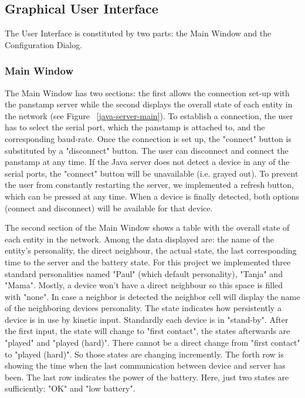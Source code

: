 \subsection{Graphical User Interface}

The User Interface is constituted by two parts: the Main Window and the Configuration Dialog.

\subsubsection{Main Window}

The Main Window has two sections: the first allows the connection set-up with the panstamp server while the second displays the overall state of each entity in the network (see Figure ~\ref{java-server-main}). 
To establish a connection, the user has to select the serial port, which the panstamp is attached to, and the corresponding baud-rate. Once the connection is set up, the "connect" button is substituted by a "disconnect" button. The user can disconnect and connect the panstamp at any time. 
If the Java server does not detect a device in any of the serial ports, the "connect" button will be unavailable (i.e. grayed out). To prevent the user from constantly restarting the server, we implemented a refresh button, which can be pressed at any time. When a device is finally detected, both options (connect and disconnect) will be available for that device.

The second section of the Main Window shows a table with the overall state of each entity in the network.
Among the data displayed are: the name of the entity's personality, the direct neighbour, the actual state, the last corresponding time to the server and the battery state. 
For this project we implemented three standard personalities named "Paul" (which default personality), "Tanja" and "Mama".
Mostly, a device won't have a direct neighbour so this space is filled with "none". In case a neighbor is detected the neighbor cell will display the name of the neighboring devices personality. 
The state indicates how persistently a device is in use by kinetic input.
Standardly each device is in "stand-by". After the first input, the state will change to "first contact", the states afterwards are "played" and "played (hard)". There cannot be a direct change from "first contact" to "played (hard)". So those states are changing incremently.
The forth row is showing the time when the last communication between device and server has been.
The last row indicates the power of the battery. Here, just two states are sufficiently: "OK" and "low battery".

